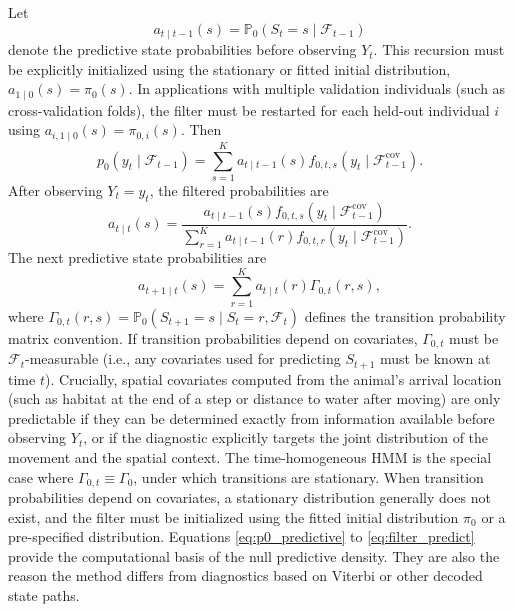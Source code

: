 \documentclass[pdflatex,sn-basic]{sn-jnl}
\theoremstyle{thmstyleone}
\theoremstyle{thmstyletwo}
\theoremstyle{thmstylethree}
\newcommand{\Pbb}{\mathbb P}
\newcommand{\1}{\mathbf 1}
\newcommand{\calF}{\mathcal F}
\begin{document}
Let
\begin{equation}
 a_{t\mid t-1}(s)=\Pbb_0(S_t=s\mid \calF_{t-1})
\end{equation}
denote the predictive state probabilities before observing $Y_t$. This recursion must be explicitly initialized using the stationary or fitted initial distribution, $a_{1\mid 0}(s) = \pi_0(s)$. In applications with multiple validation individuals (such as cross-validation folds), the filter must be restarted for each held-out individual $i$ using $a_{i,1\mid 0}(s) = \pi_{0,i}(s)$. Then
\begin{equation}
 p_0(y_t\mid\calF_{t-1})=\sum_{s=1}^K a_{t\mid t-1}(s)f_{0,t,s}(y_t\mid\calF_{t-1}^{\mathrm{cov}}).
\end{equation}
After observing $Y_t=y_t$, the filtered probabilities are
\begin{equation}
\label{eq:filter_update}
 a_{t\mid t}(s)=\frac{a_{t\mid t-1}(s)f_{0,t,s}(y_t\mid\calF_{t-1}^{\mathrm{cov}})}{\sum_{r=1}^K a_{t\mid t-1}(r)f_{0,t,r}(y_t\mid\calF_{t-1}^{\mathrm{cov}})}.
\end{equation}
The next predictive state probabilities are
\begin{equation}
\label{eq:filter_predict}
 a_{t+1\mid t}(s)=\sum_{r=1}^K a_{t\mid t}(r)\Gamma_{0,t}(r,s),
\end{equation}
where $\Gamma_{0,t}(r,s) = \Pbb_0(S_{t+1}=s\mid S_t=r,\calF_t)$ defines the transition probability matrix convention. If transition probabilities depend on covariates, $\Gamma_{0,t}$ must be $\calF_t$-measurable (i.e., any covariates used for predicting $S_{t+1}$ must be known at time $t$). Crucially, spatial covariates computed from the animal's arrival location (such as habitat at the end of a step or distance to water after moving) are only predictable if they can be determined exactly from information available before observing $Y_t$, or if the diagnostic explicitly targets the joint distribution of the movement and the spatial context. The time-homogeneous HMM is the special case where $\Gamma_{0,t} \equiv \Gamma_0$, under which transitions are stationary. When transition probabilities depend on covariates, a stationary distribution generally does not exist, and the filter must be initialized using the fitted initial distribution $\pi_0$ or a pre-specified distribution.
Equations \eqref{eq:p0_predictive} to \eqref{eq:filter_predict} provide the computational basis of the null predictive density. They are also the reason the method differs from diagnostics based on Viterbi or other decoded state paths.
\end{document}
